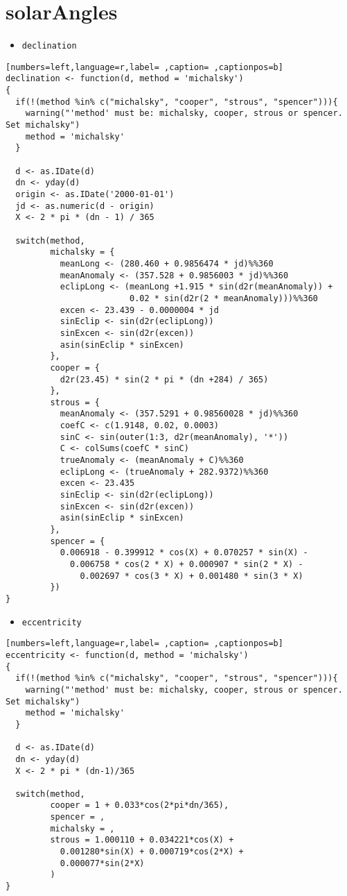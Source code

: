 \section{solarAngles}
\label{sec:org29b75bf}
\begin{itemize}
\item \texttt{declination}
\end{itemize}
\begin{lstlisting}[numbers=left,language=r,label= ,caption= ,captionpos=b]
declination <- function(d, method = 'michalsky')
{
  if(!(method %in% c("michalsky", "cooper", "strous", "spencer"))){
    warning("'method' must be: michalsky, cooper, strous or spencer.
Set michalsky")
    method = 'michalsky'
  }

  d <- as.IDate(d)
  dn <- yday(d)
  origin <- as.IDate('2000-01-01')
  jd <- as.numeric(d - origin)
  X <- 2 * pi * (dn - 1) / 365

  switch(method,
         michalsky = {
           meanLong <- (280.460 + 0.9856474 * jd)%%360
           meanAnomaly <- (357.528 + 0.9856003 * jd)%%360
           eclipLong <- (meanLong +1.915 * sin(d2r(meanAnomaly)) +
                         0.02 * sin(d2r(2 * meanAnomaly)))%%360
           excen <- 23.439 - 0.0000004 * jd
           sinEclip <- sin(d2r(eclipLong))
           sinExcen <- sin(d2r(excen))
           asin(sinEclip * sinExcen)
         },
         cooper = {
           d2r(23.45) * sin(2 * pi * (dn +284) / 365)
         },
         strous = {
           meanAnomaly <- (357.5291 + 0.98560028 * jd)%%360
           coefC <- c(1.9148, 0.02, 0.0003)
           sinC <- sin(outer(1:3, d2r(meanAnomaly), '*'))
           C <- colSums(coefC * sinC)
           trueAnomaly <- (meanAnomaly + C)%%360
           eclipLong <- (trueAnomaly + 282.9372)%%360
           excen <- 23.435
           sinEclip <- sin(d2r(eclipLong))
           sinExcen <- sin(d2r(excen))
           asin(sinEclip * sinExcen)
         },
         spencer = {
           0.006918 - 0.399912 * cos(X) + 0.070257 * sin(X) -
             0.006758 * cos(2 * X) + 0.000907 * sin(2 * X) -
               0.002697 * cos(3 * X) + 0.001480 * sin(3 * X)           
         })
}
\end{lstlisting}
\begin{itemize}
\item \texttt{eccentricity}
\end{itemize}
\begin{lstlisting}[numbers=left,language=r,label= ,caption= ,captionpos=b]
eccentricity <- function(d, method = 'michalsky')
{
  if(!(method %in% c("michalsky", "cooper", "strous", "spencer"))){
    warning("'method' must be: michalsky, cooper, strous or spencer. Set michalsky")
    method = 'michalsky'
  }
  
  d <- as.IDate(d)
  dn <- yday(d)
  X <- 2 * pi * (dn-1)/365

  switch(method,
         cooper = 1 + 0.033*cos(2*pi*dn/365),
         spencer = , 
         michalsky = , 
         strous = 1.000110 + 0.034221*cos(X) +
           0.001280*sin(X) + 0.000719*cos(2*X) +
           0.000077*sin(2*X)
         )
}
\end{lstlisting}
